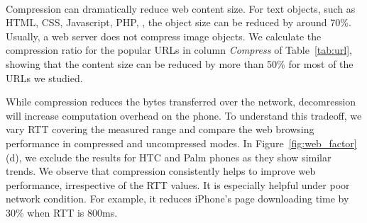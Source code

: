 \begin{figure}[t]
\centering
{}\\
\label{fig:web_js}
\end{figure}

 \label{sec:web_compress}

Compression can dramatically reduce web content size. For text objects, 
such as HTML, CSS, Javascript, PHP, \etc, the object size can be reduced 
by around 70\%. Usually, a web server does not compress image objects.
We calculate the compression ratio for the popular URLs in column 
{\em Compress} of Table~\ref{tab:url}, showing that the content size 
can be reduced by more than 50\% for most of the URLs we studied.

While compression reduces the bytes transferred over the network, 
decomression will increase computation overhead on the phone. To
understand this tradeoff, we vary RTT covering the measured range
and compare the web browsing performance in compressed and 
uncompressed modes. In Figure~\ref{fig:web_factor}(d), we exclude the 
results for HTC and Palm phones as they show similar trends. We 
observe that compression consistently helps to improve web performance,
irrespective of the RTT values. It is especially helpful under 
poor network condition.
For example, it reduces iPhone's page 
downloading time by 30\% when RTT is 800ms. 


